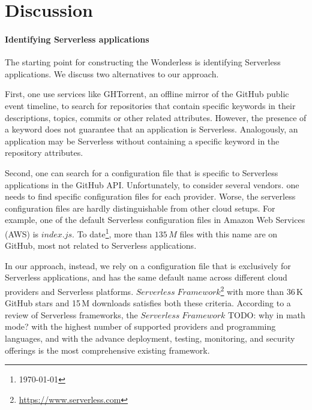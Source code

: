 
\section{Discussion}
\label{discussion}

\paragraph{Identifying Serverless applications}
The starting point for constructing the Wonderless is identifying Serverless 
applications. We discuss two alternatives to our approach.

First, one use services like GHTorrent\cite{gousios2012ghtorrent}, 
an offline mirror of the GitHub public event timeline, to search for repositories 
that contain specific keywords in their descriptions, topics, commits or other 
related attributes. However, the presence of a keyword does not guarantee 
that an application is Serverless. Analogously, an application may be Serverless 
without containing a specific keyword in the repository attributes.

Second, one can search for a configuration file that is 
specific to Serverless applications in the GitHub API. Unfortunately, to consider several vendors. 
one needs to find specific configuration files for each provider.
Worse, the serverless configuration files are hardly distinguishable from other cloud setups. 
For example, one of the default Serverless configuration files in Amazon 
Web Services\,(AWS) is $index.js$. To date\footnote{\today}, 
more than $135 \, M$ files with this name are on GitHub, most not 
related to Serverless applications. 

In our approach, instead, we rely on a configuration file that is exclusively 
for Serverless applications, and has the same default name across 
different cloud providers and Serverless platforms. 
$Serverless \; Framework$\footnote{\url{https://www.serverless.com}} 
with more than 36\,K GitHub stars and 15\,M downloads satisfies both these 
criteria. According to a review of Serverless frameworks\cite{kritikos2018review}, 
the $Serverless \; Framework$ 
TODO: why in math mode?
with the highest number of supported providers 
and programming languages, and with the advance deployment, testing, 
monitoring, and security offerings is the most comprehensive existing framework. 


